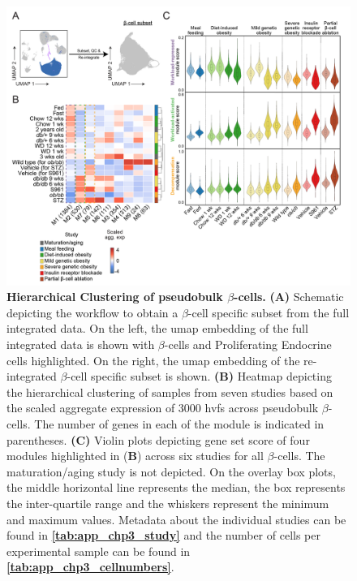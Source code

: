 \begin{figure}[t!]
\centering
\includegraphics[width=\linewidth]{Chapter5/Fig/F3-3-01.png}
\caption[Hierarchical clustering of pseudobulk $\beta$-cells]{\textbf{Hierarchical Clustering of pseudobulk $\beta$-cells.} \textbf{(A)} Schematic depicting the workflow to obtain a  $\beta$-cell specific subset from the full integrated data. On the left, the \gls{umap} embedding of the full integrated data is shown with $\beta$-cells and Proliferating Endocrine cells highlighted. On the right, the \gls{umap} embedding of the re-integrated $\beta$-cell specific subset is shown. \textbf{(B)} Heatmap depicting the hierarchical clustering of samples from seven studies based on the scaled aggregate expression of 3000 \glspl{hvf} across pseudobulk $\beta$-cells. The number of genes in each of the module is indicated in parentheses. \textbf{(C)} Violin plots depicting gene set score of four modules highlighted in (\textbf{B}) across six studies for all $\beta$-cells. The maturation/aging study is not depicted. On the overlay box plots, the middle horizontal line represents the median, the box represents the inter-quartile range and the whiskers represent the minimum and maximum values. Metadata about the individual studies can be found in \textbf{\autoref{tab:app_chp3_study}} and the number of cells per experimental sample can be found in \textbf{\autoref{tab:app_chp3_cellnumbers}}.}
\label{fig:chp3_pseudobulk}
\vspace{-10pt}
\end{figure}

